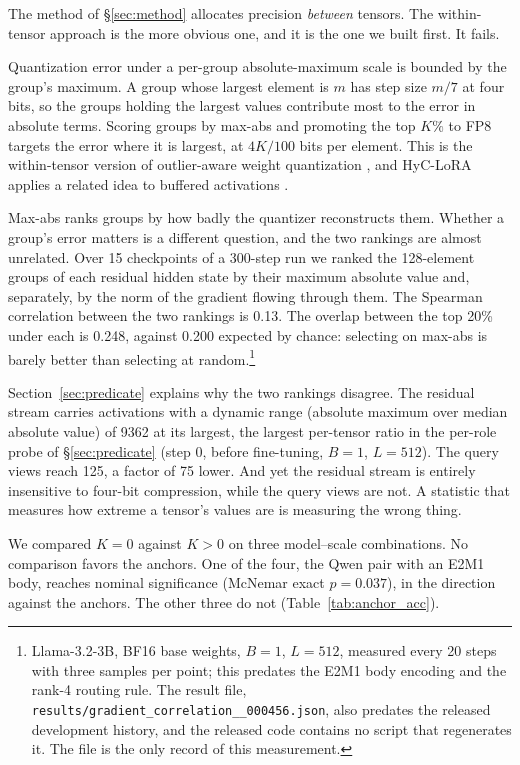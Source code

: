 \documentclass[11pt,letterpaper]{article}
\begin{document}
The method of \S\ref{sec:method} allocates precision \emph{between} tensors. The within-tensor approach is the more obvious one, and it is the one we built first. It fails.

Quantization error under a per-group absolute-maximum scale is bounded by the group's maximum. A group whose largest element is $m$ has step size $m/7$ at four bits, so the groups holding the largest values contribute most to the error in absolute terms. Scoring groups by max-abs and promoting the top $K\%$ to FP8 targets the error where it is largest, at $4K/100$ bits per element. This is the within-tensor version of outlier-aware weight quantization \citep{dettmers2022llmint8}, and HyC-LoRA applies a related idea to buffered activations \citep{hyclora2025}.

Max-abs ranks groups by how badly the quantizer reconstructs them. Whether a group's error matters is a different question, and the two rankings are almost unrelated. Over 15 checkpoints of a 300-step run we ranked the 128-element groups of each residual hidden state by their maximum absolute value and, separately, by the norm of the gradient flowing through them. The Spearman correlation between the two rankings is 0.13. The overlap between the top 20\% under each is 0.248, against 0.200 expected by chance: selecting on max-abs is barely better than selecting at random.\footnote{Llama-3.2-3B, BF16 base weights, $B{=}1$, $L{=}512$, measured every 20 steps with three samples per point; this predates the E2M1 body encoding and the rank-4 routing rule. The result file, \texttt{results/gradient\_\allowbreak correlation\_\_\allowbreak 000456.json}, also predates the released development history, and the released code contains no script that regenerates it. The file is the only record of this measurement.}


Section~\ref{sec:predicate} explains why the two rankings disagree. The residual stream carries activations with a dynamic range (absolute maximum over median absolute value) of 9362 at its largest, the largest per-tensor ratio in the per-role probe of \S\ref{sec:predicate} (step 0, before fine-tuning, $B{=}1$, $L{=}512$). The query views reach 125, a factor of 75 lower. And yet the residual stream is entirely insensitive to four-bit compression, while the query views are not. A statistic that measures how extreme a tensor's values are is measuring the wrong thing.

We compared $K{=}0$ against $K{>}0$ on three model--scale combinations. No comparison favors the anchors. One of the four, the Qwen pair with an E2M1 body, reaches nominal significance (McNemar exact $p = 0.037$), in the direction against the anchors. The other three do not (Table~\ref{tab:anchor_acc}).
\end{document}
